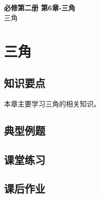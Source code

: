\documentclass[12pt,a4paper]{article}
\begin{document}
\begin{center}
\LARGE\textbf{必修第二册 第6章-三角} \\[0.5em]
\large 三角
\end{center}

\tableofcontents
\newpage

\section{三角}

\subsection{知识要点}
本章主要学习三角的相关知识。

\subsection{典型例题}

\subsection{课堂练习}

\subsection{课后作业}
\end{document}

